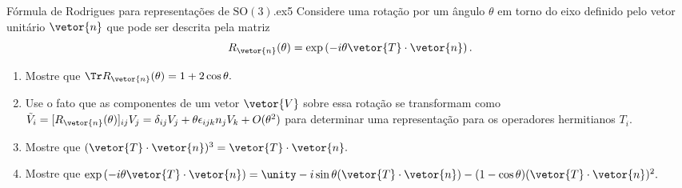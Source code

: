 \begin{exercício}{Fórmula de Rodrigues para representações de \(\mathrm{SO}(3).\)}{ex5}
   Considere uma rotação por um ângulo \(\theta\) em torno do eixo definido pelo vetor unitário \(\vetor{n}\) que pode ser descrita pela matriz
   \begin{equation*}
      R_{\vetor{n}}(\theta) = \exp\left(-i\theta \vetor{T}\cdot \vetor{n}\right).
   \end{equation*}
   \begin{enumerate}[label=(\alph*)]
      \item Mostre que \(\Tr R_{\vetor{n}}(\theta) = 1 + 2 \cos\theta.\)
      \item Use o fato que as componentes de um vetor \(\vetor{V}\) sobre essa rotação se transformam como \(\tilde{V}_i = [R_{\vetor{n}}(\theta)]_{ij} V_j = \delta_{ij}V_j + \theta \epsilon_{ijk} n_j V_k + O(\theta^2)\) para determinar uma representação para os operadores hermitianos \(T_i\).
      \item Mostre que \((\vetor{T}\cdot \vetor{n})^3 = \vetor{T}\cdot \vetor{n}.\)
      \item Mostre que \(\exp\left(-i\theta\vetor{T}\cdot\vetor{n}\right) = \unity - i \sin\theta (\vetor{T} \cdot \vetor{n}) - (1 - \cos\theta) (\vetor{T}\cdot \vetor{n})^2.\)
   \end{enumerate}
\end{exercício}
